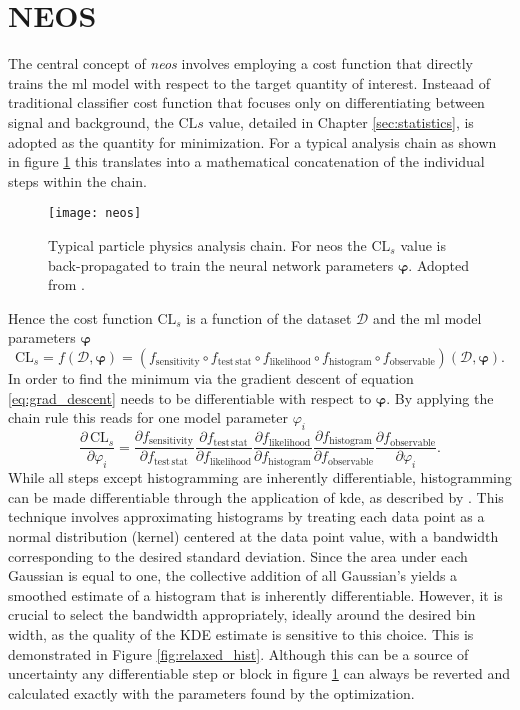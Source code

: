 \section{NEOS}
The central concept of \textit{\acl{neos}} involves employing a cost function that directly trains the \ac{ml} model with respect to the target quantity of interest. Insteaad of traditional classifier cost function that focuses only on differentiating between signal and background, the $\mathrm{CL}s$ value, detailed in Chapter \ref{sec:statistics}, is adopted as the quantity for minimization. For a typical analysis chain as shown in figure \ref{fig:neos} this translates into a mathematical concatenation of the individual steps within the chain.
\begin{figure}
    \centering
    \texttt{[image: neos]}
    \caption[]{Typical particle physics analysis chain. For \ac{neos} the $\text{CL}_s$ value is back-propagated to train the neural network parameters $\bm{\varphi}$. Adopted from \citep{Simpson_2023}.}
    \label{fig:neos}
\end{figure}
Hence the cost function $\text{CL}_s$ is a function of the dataset $\mathcal{D}$ and the \ac{ml} model parameters $\bm{\varphi}$
\begin{equation}
    \mathrm{CL}_s = f(\mathcal{D},\bm{\varphi}) = (f_{\mathrm{sensitivity}} \circ f_{\mathrm{test\,stat}} \circ f_{\mathrm{likelihood}}  \circ f_{\mathrm{histogram}}  \circ f_{\mathrm{observable}})(\mathcal{D},\bm{\varphi}).
\end{equation}
In order to find the minimum via the gradient descent of equation \ref{eq:grad_descent} \cls needs to be differentiable with respect to $\bm{\varphi}$. By applying the chain rule this reads for one model parameter $\varphi_i$
\begin{equation}
    \frac{\partial\,\mathrm{CL}_s}{\partial \varphi_i} = \frac{\partial f_{\mathrm{sensitivity}}}{\partial f_{\mathrm{test\,stat}}}\frac{\partial f_{\mathrm{test\,stat}}}{\partial f_{ \mathrm{likelihood}}} \frac{\partial f_{\mathrm{likelihood}}}{\partial f_{\mathrm{histogram}}}   \frac{\partial f_{\mathrm{histogram}}}{\partial f_{\mathrm{observable}}}  \frac{\partial f_{\mathrm{observable}}}{\partial \varphi_i}.
\end{equation}
While all steps except histogramming are inherently differentiable, histogramming can be made differentiable through the application of \ac{kde}, as described by \citep{CRANMER2001198}. This technique involves approximating histograms by treating each data point as a normal distribution (kernel) centered at the data point value, with a bandwidth corresponding to the desired standard deviation. Since the area under each Gaussian is equal to one, the collective addition of all Gaussian's yields a smoothed estimate of a histogram that is inherently differentiable. However, it is crucial to select the bandwidth appropriately, ideally around the desired bin width, as the quality of the KDE estimate is sensitive to this choice. This is demonstrated in Figure \ref{fig:relaxed_hist}. Although this can be a source of uncertainty any differentiable step or block in figure \ref{fig:neos} can always be reverted and calculated exactly with the parameters found by the optimization.
